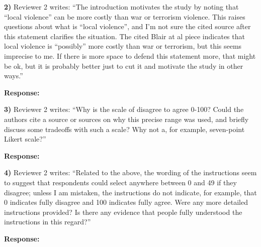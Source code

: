 \documentclass[a4paper,12pt]{article}
\begin{document}
\vspace{.3cm}

\noindent \textbf{2)} Reviewer 2 writes: ``The introduction motivates the study
by noting that ``local violence'' can be more costly than war or terrorism
violence. This raises questions about what is ``local violence'', and I'm not
sure the cited source after this statement clarifies the situation. The cited
Blair at al piece indicates that local violence is ``possibly'' more costly
than war or terrorism, but this seems imprecise to me. If there is more space
to defend this statement more, that might be ok, but it is probably better just
to cut it and motivate the study in other ways.''

\vspace{.3cm}

\noindent \textbf{Response:} 
\begin{quote}

  

\end{quote}

\vspace{.3cm}

\noindent \textbf{3)} Reviewer 2 writes: ``Why is the scale of disagree to
agree 0-100? Could the authors cite a source or sources on why this precise
range was used, and briefly discuss some tradeoffs with such a scale? Why not
a, for example, seven-point Likert scale?''

\vspace{.3cm}

\noindent \textbf{Response:} 
\begin{quote}

\end{quote}

\vspace{.3cm}

\noindent \textbf{4)} Reviewer 2 writes: ``Related to the above, the wording of
the instructions seem to suggest that respondents could select anywhere between
0 and 49 if they disagree; unless I am mistaken, the instructions do not
indicate, for example, that 0 indicates fully disagree and 100 indicates fully
agree. Were any more detailed instructions provided? Is there any evidence that
people fully understood the instructions in this regard?''

\vspace{.3cm}

\noindent \textbf{Response:} 
\begin{quote}

\end{quote}
\end{document}
